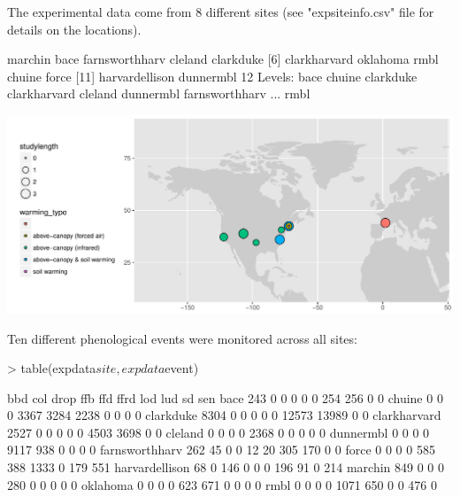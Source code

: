 \documentclass{article}
\begin{document}
The experimental data come from 8 different sites (see "expsiteinfo.csv" file for details on the locations).

\begin{Schunk}
\begin{Soutput}
 [1] marchin        bace           farnsworthharv cleland        clarkduke     
 [6] clarkharvard   oklahoma       rmbl           chuine         force         
[11] harvardellison dunnermbl     
12 Levels: bace chuine clarkduke clarkharvard cleland dunnermbl farnsworthharv ... rmbl
\end{Soutput}
\end{Schunk}
\includegraphics{maps/expsites.pdf}

Ten different phenological events were monitored across all sites:
\begin{Schunk}
\begin{Sinput}
> table(expdata$site, expdata$event)
\end{Sinput}
\begin{Soutput}
                   bbd   col  drop   ffb   ffd  ffrd   lod   lud    sd   sen
  bace             243     0     0     0     0     0   254   256     0     0
  chuine             0     0     0  3367  3284  2238     0     0     0     0
  clarkduke       8304     0     0     0     0     0 12573 13989     0     0
  clarkharvard    2527     0     0     0     0     0  4503  3698     0     0
  cleland            0     0     0     0  2368     0     0     0     0     0
  dunnermbl          0     0     0     0  9117   938     0     0     0     0
  farnsworthharv   262    45     0     0    12    20   305   170     0     0
  force              0     0     0     0   585   388  1333     0   179   551
  harvardellison    68     0   146     0     0     0   196    91     0   214
  marchin          849     0     0     0   280     0     0     0     0     0
  oklahoma           0     0     0     0   623   671     0     0     0     0
  rmbl               0     0     0     0  1071   650     0     0   476     0
\end{Soutput}
\end{Schunk}
\end{document}
